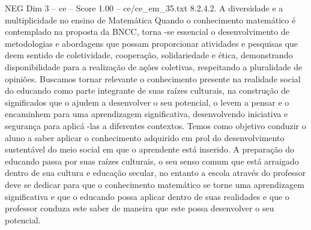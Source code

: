 \begin{textsample}{NEG Dim 3 – ce – Score 1.00 – ce/ce\_em\_35.txt}  \label{ex:f3_neg_234}
8.2.4.2.
A diversidade e a multiplicidade no ensino de Matemática Quando o conhecimento matemático é contemplado na proposta da BNCC, torna -se essencial o desenvolvimento de metodologias e abordagens que possam proporcionar atividades e pesquisas que deem sentido de coletividade, cooperação, solidariedade e ética, demonstrando disponibilidade para a realização de ações coletivas, respeitando a pluralidade de opiniões.
Buscamos tornar relevante o conhecimento presente na realidade social do educando como parte integrante de suas raízes culturais, na construção de significados que o ajudem a desenvolver o seu potencial, o levem a pensar e o encaminhem para uma aprendizagem significativa, desenvolvendo iniciativa e segurança para aplicá -las a diferentes contextos.
Temos como objetivo conduzir o aluno a saber aplicar o conhecimento adquirido em prol do desenvolvimento sustentável do meio social em que o aprendente está inserido.
A preparação do educando passa por suas raízes culturais, o seu senso comum que está arraigado dentro de sua cultura e educação secular, no entanto a escola através do professor deve se dedicar para que o conhecimento matemático se torne uma aprendizagem significativa e que o educando possa aplicar dentro de suas realidades e que o professor conduza este saber de maneira que este possa desenvolver o seu potencial.

\end{textsample}
